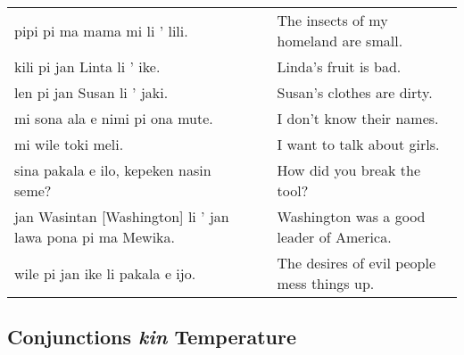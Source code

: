 \begin{supertabular}{p{5,5cm}|ll}
    pipi pi ma mama mi li ' lili.                              &  & The insects of my homeland are small.      \\
    kili pi jan Linta li ' ike.                                &  & Linda's fruit is bad.                      \\
    len pi jan Susan li ' jaki.                                &  & Susan's clothes are dirty.                 \\
    mi sona ala e nimi pi ona mute.                            &  & I don't know their names.                  \\
    mi wile toki meli.                                         &  & I want to talk about girls.                \\
    sina pakala e ilo, kepeken nasin seme?                     &  & How did you break the tool?                \\
    jan Wasintan [Washington] li ' jan lawa pona pi ma Mewika. &  & Washington was a good leader of America.   \\
    wile pi jan ike li pakala e ijo.                           &  & The desires of evil people mess things up. \\
\end{supertabular}

\newpage

\subsection*{Conjunctions \textit{kin} Temperature}
\label{'conjunctions_temperature'}


